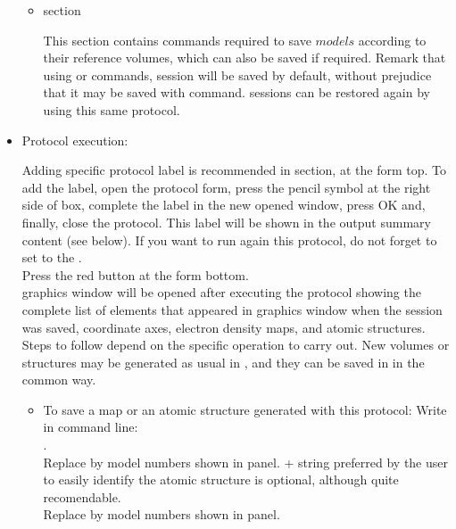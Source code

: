 \begin{itemize}
\begin{itemize}
\begin{itemize}
    \end{itemize}
    \item {} section
    
    This section contains \chimera commands required to save $models$ according to their reference volumes, which can also be saved if required. Remark that using  or  commands, \chimera session will be saved by default, without prejudice that it may be saved with  command. \chimera sessions can be restored again by using this same  protocol.
    
    \end{itemize}

  \item Protocol execution:
  
  Adding specific protocol label is recommended in  section, at the form top. To add the label, open the protocol form, press the pencil symbol at the right side of  box, complete the label in the new opened window, press OK and, finally, close the protocol. This label will be shown in the output summary content (see below). If you want to run again this protocol, do not forget to set to  the .\\
  Press the  red button at the form bottom.\\
  
  \chimera graphics window will be opened after executing the protocol showing the complete list of elements that appeared in \chimera graphics window when the session was saved, coordinate axes, electron density maps, and atomic structures. Steps to follow depend on the specific operation to carry out. New volumes or structures may be generated as usual in \chimera, and they can be saved in \scipion in the common way.
  \begin{itemize}
   
   \item To save a map or an atomic structure generated with this protocol:
   Write in \chimera command line:\\
   .\\Replace {} by model numbers shown in \chimera {} panel.  + string preferred by the user to easily identify the atomic structure is optional, although quite recomendable.\\
   Replace  by model numbers shown in \chimera {} panel. 
   

\end{itemize}
\end{itemize}
